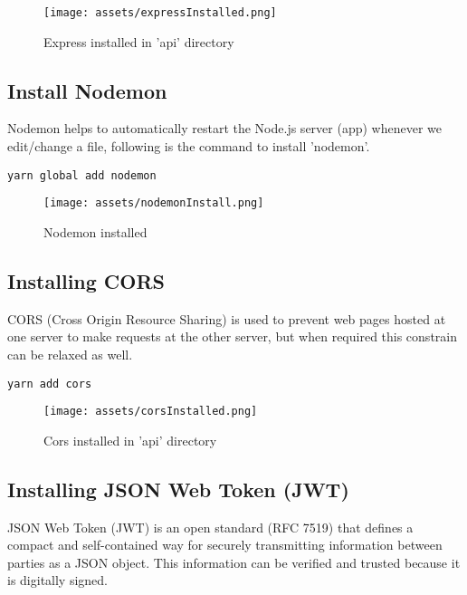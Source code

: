 \documentclass[12pt]{article}
\begin{document}
\begin{figure}[H]
    \centering
    \texttt{[image: assets/expressInstalled.png]}
    \caption{Express installed in 'api' directory}
    \label{fig:logo}
\end{figure}

\subsection{Install Nodemon}

Nodemon helps to automatically restart the Node.js server (app) whenever we edit/change a file, following is the command to install 'nodemon'.

\begin{listing}[htbp]
\begin{verbatim}
yarn global add nodemon
\end{verbatim}
\end{listing}

\begin{figure}[H]
    \centering
    \texttt{[image: assets/nodemonInstall.png]}
    \caption{Nodemon installed}
    \label{fig:logo}
\end{figure}
\clearpage


\subsection{Installing CORS}

CORS (Cross Origin Resource Sharing) is used to prevent web pages hosted at one server to make requests at the other server, but when required this constrain can be relaxed as well.

\begin{listing}[htbp]
\begin{verbatim}
yarn add cors
\end{verbatim}
\end{listing}


\begin{figure}[H]
    \centering
    \texttt{[image: assets/corsInstalled.png]}
    \caption{Cors installed in 'api' directory}
    \label{fig:logo}
\end{figure}


\subsection{Installing JSON Web Token (JWT)}
JSON Web Token (JWT) is an open standard (RFC 7519) that defines a compact and self-contained way for securely transmitting information between parties as a JSON object. This information can be verified and trusted because it is digitally signed. 
\end{document}
